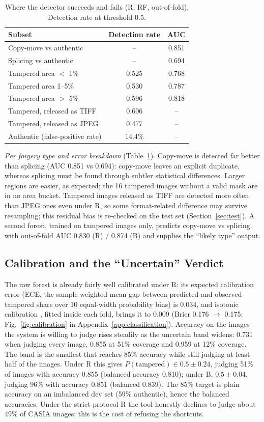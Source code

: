 \begin{table}[!t]
\centering
\caption{Where the detector succeeds and fails (R, RF, out-of-fold). Detection rate at threshold 0.5.}
\label{tab:cls-breakdown}
\footnotesize
\begin{tabular}{lcc}
\toprule
Subset & Detection rate & AUC \\
\midrule
Copy-move vs authentic & -- & 0.851 \\
Splicing vs authentic & -- & 0.694 \\
Tampered area $<$ 1\% & 0.525 & 0.768 \\
Tampered area 1--5\% & 0.530 & 0.787 \\
Tampered area $>$ 5\% & 0.596 & 0.818 \\
Tampered, released as TIFF & 0.606 & -- \\
Tampered, released as JPEG & 0.477 & -- \\
\midrule
Authentic (false-positive rate) & 14.4\% & -- \\
\bottomrule
\end{tabular}
\end{table}

\emph{Per forgery type and error breakdown} (Table~\ref{tab:cls-breakdown}). Copy-move is detected far better than splicing (AUC 0.851 vs 0.694): copy-move leaves an explicit duplicate, whereas splicing must be found through subtler statistical differences. Larger regions are easier, as expected; the 16 tampered images without a valid mask are in no area bucket. Tampered images released as TIFF are detected more often than JPEG ones even under R, so some format-related difference may survive resampling; this residual bias is re-checked on the test set (Section~\ref{sec:test}). A second forest, trained on tampered images only, predicts copy-move vs splicing with out-of-fold AUC 0.830 (R) / 0.874 (B) and supplies the ``likely type'' output.

\subsection{Calibration and the ``Uncertain'' Verdict}\label{sec:classification-calib}
The raw forest is already fairly well calibrated under R: its expected calibration error (ECE, the sample-weighted mean gap between predicted and observed tampered share over 10 equal-width probability bins) is 0.034, and isotonic calibration \cite{zadrozny2002calib}, fitted inside each fold, brings it to 0.009 (Brier 0.176 $\to$ 0.175; Fig.~\ref{fig:calibration} in Appendix~\ref{app:classification}). Accuracy on the images the system is willing to judge rises steadily as the uncertain band widens: 0.731 when judging every image, 0.855 at 51\% coverage and 0.959 at 12\% coverage. The band is the smallest that reaches 85\% accuracy while still judging at least half of the images. Under R this gives $P(\text{tampered}) \in 0.5 \pm 0.24$, judging 51\% of images with accuracy 0.855 (balanced accuracy 0.810); under B, $0.5 \pm 0.04$, judging 96\% with accuracy 0.851 (balanced 0.839). The 85\% target is plain accuracy on an imbalanced dev set (59\% authentic), hence the balanced accuracies. Under the strict protocol R the tool honestly declines to judge about 49\% of CASIA images; this is the cost of refusing the shortcuts.

